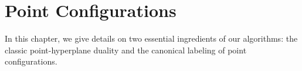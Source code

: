 \chapter{Point Configurations}%
\label{chaper:point-configurations}

In this chapter,
we give details on two essential ingredients of our algorithms:
the classic point-hyperplane duality
and
the canonical labeling of point configurations.




